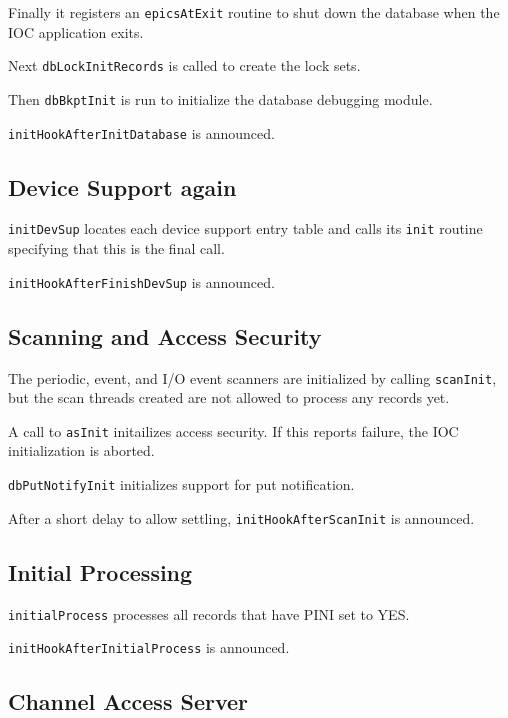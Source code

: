 Finally it registers an \verb|epicsAtExit| routine to shut down the database when the IOC application exits.

Next \verb|dbLockInitRecords| is called to create the lock sets.

Then \verb|dbBkptInit| is run to initialize the database debugging module.

\verb|initHookAfterInitDatabase| is announced.

\subsection{Device Support again}

\verb|initDevSup| locates each device support entry table and calls its \verb|init| routine specifying that this is the final call.

\verb|initHookAfterFinishDevSup| is announced.

\subsection{Scanning and Access Security}

The periodic, event, and I/O event scanners are initialized by calling \verb|scanInit|, but the scan threads created are not allowed to process any records yet.

A call to \verb|asInit| initailizes access security.
If this reports failure, the IOC initialization is aborted.

\verb|dbPutNotifyInit| initializes support for put notification.

After a short delay to allow settling, \verb|initHookAfterScanInit| is announced.

\subsection{Initial Processing}

\verb|initialProcess| processes all records that have PINI set to YES.

\verb|initHookAfterInitialProcess| is announced.

\subsection{Channel Access Server}

